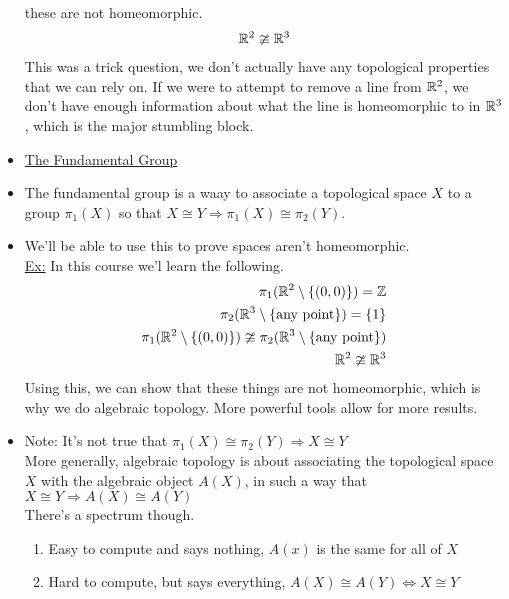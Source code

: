 \begin{itemize}
            these are not homeomorphic.
            \begin{align*}
                \mathbb{R}^2 \ncong \mathbb{R}^3\\
            \end{align*}
            This was a trick question, we don't actually have any topological properties that we can rely on. If we were
            to attempt to remove a line from $\mathbb{R}^2$, we don't have enough information about what the line is homeomorphic to
            in $\mathbb{R}^3$, which is the major stumbling block.
        \item\underline{The Fundamental Group}
        \item The fundamental group is a waay to associate a topological space $X$ to a group $\pi_1(X)$ so that
            $X\cong Y \Rightarrow \pi_1(X)\cong\pi_2(Y)$. 
        \item We'll be able to use this to prove spaces aren't homeomorphic.\\
            \underline{Ex:} In this course we'l learn the following.
            \begin{align*}
                \pi_1(\mathbb{R}^2\setminus\{(0,0)\})=\mathbb{Z}\\
                \pi_2(\mathbb{R}^3\setminus\{\text{any point}\})=\{1\}\\
                \pi_1(\mathbb{R}^2\setminus\{(0,0)\})\ncong \pi_2(\mathbb{R}^3\setminus\{\text{any point}\})\\
                \mathbb{R}^2\ncong\mathbb{R}^3\\
            \end{align*}
            Using this, we can show that these things are not homeomorphic, which is why we do algebraic topology.
            More powerful tools allow for more results.
        \item Note: It's not true that $\pi_1(X)\cong \pi_2(Y)\Rightarrow X\cong Y$\\
            More generally, algebraic topology is about associating the topological space $X$ 
            with the algebraic object $A(X)$, in such a way that $X\cong Y \Rightarrow A(X)\cong A(Y)$\\
            There's a spectrum though.
            \begin{enumerate}
                \item Easy to compute and says nothing, $A(x)$ is the same for all of $X$
                \item Hard to compute, but says everything, $A(X)\cong A(Y) \iff X\cong Y$
            \end{enumerate}
    \end{itemize}
